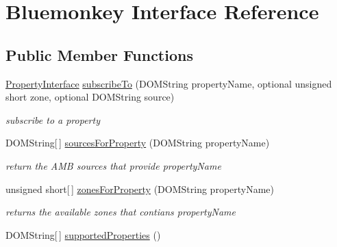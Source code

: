 \hypertarget{interfaceBluemonkey}{\section{Bluemonkey Interface Reference}
\label{interfaceBluemonkey}
}
\subsection*{Public Member Functions}
\begin{DoxyCompactItemize}
\item 
\hyperlink{interfacePropertyInterface}{Property\+Interface} \hyperlink{interfaceBluemonkey_a7e72bc8500a8d4534f66c099b58386d4}{subscribe\+To} (D\+O\+M\+String property\+Name, optional unsigned short zone, optional D\+O\+M\+String source)
\begin{DoxyCompactList}\small\item\em subscribe to a property \end{DoxyCompactList}\item 
\hypertarget{interfaceBluemonkey_a221e849e946faa1f8473b3f0494f533e}{D\+O\+M\+String\mbox{[}$\,$\mbox{]} \hyperlink{interfaceBluemonkey_a221e849e946faa1f8473b3f0494f533e}{sources\+For\+Property} (D\+O\+M\+String property\+Name)}\label{interfaceBluemonkey_a221e849e946faa1f8473b3f0494f533e}

\begin{DoxyCompactList}\small\item\em return the A\+M\+B sources that provide property\+Name \end{DoxyCompactList}\item 
\hypertarget{interfaceBluemonkey_a34f0f5eaaa28e51d2b06e16022abfaf6}{unsigned short\mbox{[}$\,$\mbox{]} \hyperlink{interfaceBluemonkey_a34f0f5eaaa28e51d2b06e16022abfaf6}{zones\+For\+Property} (D\+O\+M\+String property\+Name)}\label{interfaceBluemonkey_a34f0f5eaaa28e51d2b06e16022abfaf6}

\begin{DoxyCompactList}\small\item\em returns the available zones that contians property\+Name \end{DoxyCompactList}\item 
\hypertarget{interfaceBluemonkey_af59e3134907247f66d3fa213a71ad37e}{D\+O\+M\+String\mbox{[}$\,$\mbox{]} \hyperlink{interfaceBluemonkey_af59e3134907247f66d3fa213a71ad37e}{supported\+Properties} ()}\label{interfaceBluemonkey_af59e3134907247f66d3fa213a71ad37e}


\end{DoxyCompactItemize}
